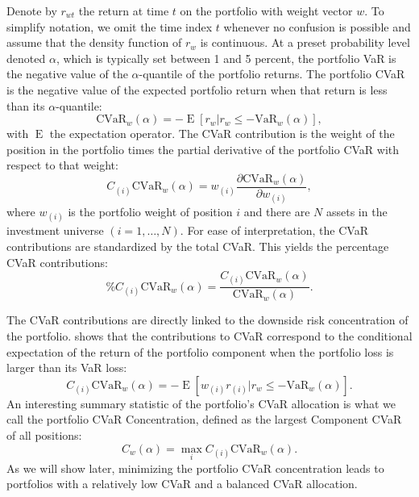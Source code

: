 \documentclass[12pt,a4paper]{article}
\DeclareMathOperator{\E}{\operatorname{E}}
\begin{document}
Denote by $r_{wt}$  the return at time $t$  on the portfolio with weight vector $w$. To simplify notation, we omit the time index $t$ whenever no confusion is possible and assume that the density function of $r_w$ is continuous. At a preset probability level denoted $\alpha$, which is typically set between 1 and 5 percent, the portfolio VaR is the negative value of the  $\alpha$-quantile of the portfolio returns. The portfolio CVaR is the negative value of the expected portfolio return when that return is less than its  $\alpha$-quantile:
\begin{equation} \mbox{CVaR}_w(\alpha) = - \E[r_w | r_w \leq -\mbox{VaR}_w(\alpha)], \label{eq:CVaR} \end{equation} with $\E$ the expectation operator. The CVaR contribution is the weight of the position in the portfolio times the partial derivative of the portfolio CVaR with respect to that weight:
\begin{equation} C_{(i)}\mbox{CVaR}_w(\alpha) = w_{(i)} \frac{ \partial  \mbox{CVaR}_w(\alpha) }{\partial w_{(i)}} , \label{eq:CVaR} \end{equation}
where $w_{(i)}$  is the portfolio weight of position $i$  and there are $N$ assets in the investment universe $(i=1,\ldots,N).$
For ease of interpretation, the CVaR contributions are standardized by the total CVaR. This yields the percentage CVaR contributions:
\begin{equation}  \%C_{(i)}\mbox{CVaR}_w(\alpha) = \frac{C_{(i)}\mbox{CVaR}_w(\alpha) }{\mbox{CVaR}_w(\alpha)} .\label{eq:PercCVaR} \end{equation}

 The CVaR contributions are directly linked to the downside risk concentration of the portfolio. \citet{Scaillet2002} shows that the contributions to CVaR correspond to the conditional expectation of the return of the portfolio component when the portfolio loss is larger than its VaR loss:
 \begin{equation} C_{(i)}\mbox{CVaR}_w(\alpha) = - \E[w_{(i)}r_{(i)} | r_w \leq -\mbox{VaR}_w(\alpha)]. \label{eq:C_CVaR_scaillet} \end{equation}
 An interesting summary statistic of the portfolio's CVaR allocation is what we call the portfolio CVaR Concentration, defined as the largest Component CVaR of all positions:
\begin{equation}  C_w(\alpha) = \max_i C_{(i)}\mbox{CVaR}_w(\alpha) .\label{eq:CVaRConc} \end{equation} As we will show later, minimizing the portfolio CVaR concentration leads to portfolios with a relatively low CVaR and a balanced CVaR allocation.
\end{document}
